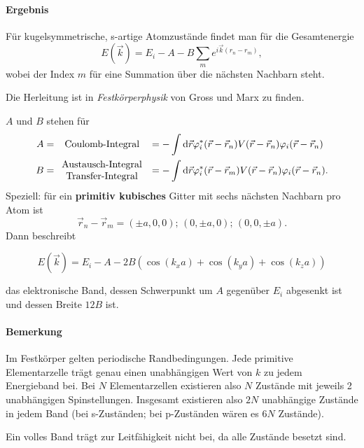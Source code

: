 \paragraph{Ergebnis} 
	Für kugelsymmetrische, s-artige Atomzustände findet man für die Gesamtenergie
	$$
	E(\Vec{k}) = E_{i} - A - B \sum_{m }^{} e^{i\Vec{k}(r_{n} - r_{m})} ,
	$$ 
	wobei der Index $m$ für eine Summation über die nächsten Nachbarn steht.
	\begin{verbal}
		Die Herleitung ist in \textit{Festkörperphysik} von Gross und Marx zu finden.
	\end{verbal}
	$A$ und $B$ stehen für 
	$$
	\begin{aligned}
		A &= \hspace{8pt}\text{Coulomb-Integral} &&= - \int \text{d}\Vec{r} \varphi_{i} ^{*} (\Vec{r}-\Vec{r}_{n}) V(\Vec{r}-\Vec{r}_{n}) \varphi_{i} (\Vec{r}-\Vec{r}_{n}) \\
		B &= \begin{array}{c} \text{Austausch-Integral} \\ \text{Transfer-Integral}\\ \end{array} \hspace{-9pt}  &&= - \int \text{d}\Vec{r} \varphi_{i}^{*} (\Vec{r}-\Vec{r}_{m})V(\Vec{r}-\Vec{r}_{n}) \varphi_{i}(\Vec{r}-\Vec{r}_{n}).
	\end{aligned}
	$$
	Speziell: für ein \textbf{primitiv kubisches} Gitter mit sechs nächsten Nachbarn pro Atom ist
	$$
	\Vec{r}_{n} - \Vec{r}_{m} = (\pm a, 0, 0);\, (0, \pm a, 0);\, (0, 0, \pm a).
	$$
	Dann beschreibt
	\begin{important}
		$$
		E(\Vec{k}) = E_{i} - A - 2B \left( \cos\left( k_{x} a \right) + \cos\left( k_{y}a \right) + \cos\left( k_{z}a \right)  \right) 
		$$  
	\end{important}
	das elektronische Band, dessen Schwerpunkt um $A$ gegenüber $E_{i}$ abgesenkt ist und dessen Breite $12B$ ist.

\paragraph{Bemerkung}
	Im Festkörper gelten periodische Randbedingungen.
	Jede primitive Elementarzelle trägt genau einen unabhängigen Wert von $k$ zu jedem Energieband bei.
	Bei $N$ Elementarzellen existieren also $N$ Zustände mit jeweils 2 unabhängigen Spinstellungen.
	Insgesamt existieren also $2N$ unabhängige Zustände in jedem Band (bei s-Zuständen; bei p-Zuständen wären es $6N$ Zustände).
	\begin{important}
		Ein volles Band trägt zur Leitfähigkeit nicht bei, da alle Zustände besetzt sind.
	\end{important}

